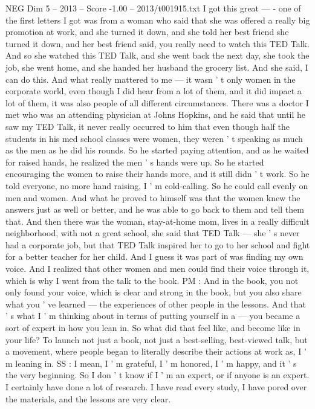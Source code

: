 \begin{textsample}{NEG Dim 5 – 2013 – Score -1.00 – 2013/t001915.txt}
I got this great — - one of the first letters I got was from a woman who said that she was offered a really big promotion at work, and she turned it down, and she told her best friend she turned it down, and her best friend said, you really need to watch this TED Talk.
And so she watched this TED Talk, and she went back the next day, she took the job, she went home, and she handed her husband the grocery list.
And she said, I can do this.
And what really mattered to me — it wasn ' t only women in the corporate world, even though I did hear from a lot of them, and it did impact a lot of them, it was also people of all different circumstances.
There was a doctor I met who was an attending physician at Johns Hopkins, and he said that until he saw my TED Talk, it never really occurred to him that even though half the students in his med school classes were women, they weren ' t speaking as much as the men as he did his rounds.
So he started paying attention, and as he waited for raised hands, he realized the men ' s hands were up.
So he started encouraging the women to raise their hands more, and it still didn ' t work.
So he told everyone, no more hand raising, I ' m cold-calling.
So he could call evenly on men and women.
And what he proved to himself was that the women knew the answers just as well or better, and he was able to go back to them and tell them that.
And then there was the woman, stay-at-home mom, lives in a really difficult neighborhood, with not a great school, she said that TED Talk — she ' s never had a corporate job, but that TED Talk inspired her to go to her school and fight for a better teacher for her child.
And I guess it was part of was finding my own voice.
And I realized that other women and men could find their voice through it, which is why I went from the talk to the book.
PM : And in the book, you not only found your voice, which is clear and strong in the book, but you also share what you ' ve learned — the experiences of other people in the lessons.
And that ' s what I ' m thinking about in terms of putting yourself in a — you became a sort of expert in how you lean in.
So what did that feel like, and become like in your life?
To launch not just a book, not just a best-selling, best-viewed talk, but a movement, where people began to literally describe their actions at work as, I ' m leaning in.
SS : I mean, I ' m grateful, I ' m honored, I ' m happy, and it ' s the very beginning.
So I don ' t know if I ' m an expert, or if anyone is an expert.
I certainly have done a lot of research.
I have read every study, I have pored over the materials, and the lessons are very clear.

\end{textsample}
